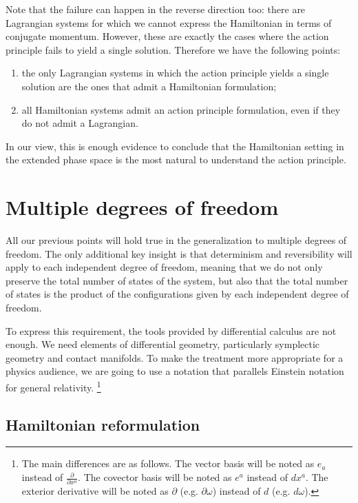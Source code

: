 \documentclass[10pt,twocolumn, nofootinbib]{revtex4-2}
\begin{document}
Note that the failure can happen in the reverse direction too: there are Lagrangian systems for which we cannot express the Hamiltonian in terms of conjugate momentum. However, these are exactly the cases where the action principle fails to yield a single solution. Therefore we have the following points:
\begin{enumerate}
	\item the only Lagrangian systems in which the action principle yields a single solution are the ones that admit a Hamiltonian formulation;
	\item all Hamiltonian systems admit an action principle formulation, even if they do not admit a Lagrangian.
\end{enumerate}

In our view, this is enough evidence to conclude that the Hamiltonian setting in the extended phase space is the most natural to understand the action principle.

\section{Multiple degrees of freedom}

All our previous points will hold true in the generalization to multiple degrees of freedom. The only additional key insight is that determinism and reversibility will apply to each independent degree of freedom, meaning that we do not only preserve the total number of states of the system, but also that the total number of states is the product of the configurations given by each independent degree of freedom.

To express this requirement, the tools provided by differential calculus are not enough. We need elements of differential geometry, particularly symplectic geometry and contact manifolds. To make the treatment more appropriate for a physics audience, we are going to use a notation that parallels Einstein notation for general relativity. \footnote{The main differences are as follows. The vector basis will be noted as $e_a$ instead of $\frac{\partial}{\partial x^a}$. The covector basis will be noted as $e^a$ instead of $dx^a$. The exterior derivative will be noted as $\partial$ (e.g. $\partial \omega$) instead of $d$ (e.g. $d \omega$).}

\subsection{Hamiltonian reformulation}
\end{document}
